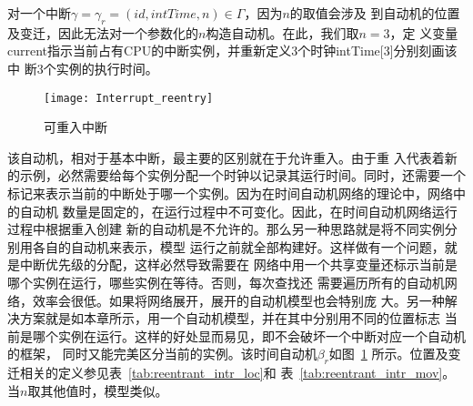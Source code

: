 对一个中断$\gamma=\gamma_r=(id, intTime, n)\in\varGamma$，因为$n$的取值会涉及
到自动机的位置及变迁，因此无法对一个参数化的$n$构造自动机。在此，我们取$n=3$，定
义变量current指示当前占有CPU的中断实例，并重新定义3个时钟intTime[3]分别刻画该中
断3个实例的执行时间。

\begin{figure}[H]
	\centering
	\texttt{[image: Interrupt\_reentry]}
	\caption{可重入中断}
	\label{fig:interrupt_reentrant}
\end{figure}

该自动机，相对于基本中断，最主要的区别就在于允许重入。由于重
入代表着新的示例，必然需要给每个实例分配一个时钟以记录其运行时间。同时，还需要一个
标记来表示当前的中断处于哪一个实例。因为在时间自动机网络的理论中，网络中的自动机
数量是固定的，在运行过程中不可变化。因此，在时间自动机网络运行过程中根据重入创建
新的自动机是不允许的。那么另一种思路就是将不同实例分别用各自的自动机来表示，模型
运行之前就全部构建好。这样做有一个问题，就是中断优先级的分配，这样必然导致需要在
网络中用一个共享变量还标示当前是哪个实例在运行，哪些实例在等待。否则，每次查找还
需要遍历所有的自动机网络，效率会很低。如果将网络展开，展开的自动机模型也会特别庞
大。另一种解决方案就是如本章所示，用一个自动机模型，并在其中分别用不同的位置标志
当前是哪个实例在运行。这样的好处显而易见，即不会破坏一个中断对应一个自动机的框架，
同时又能完美区分当前的实例。该时间自动机$\beta_r$如图~\ref{fig:interrupt_reentrant} 
所示。位置及变迁相关的定义参见表~\ref{tab:reentrant_intr_loc}和
表~\ref{tab:reentrant_intr_mov}。当$n$取其他值时，模型类似。


